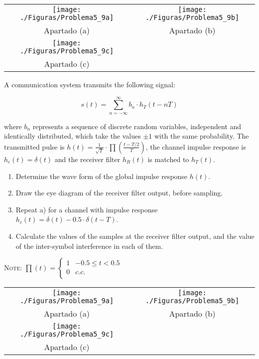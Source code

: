 \documentclass[es,boletin]{uah}
\begin{document}
{

\begin{tabular}[h]{cc}
	\texttt{[image: ./Figuras/Problema5\_9a]} &
	\texttt{[image: ./Figuras/Problema5\_9b]} \\
	Apartado (a) & Apartado (b) \\
	\texttt{[image: ./Figuras/Problema5\_9c]} &
	\\
	Apartado (c) & \\
\end{tabular}

}
{

A communication system transmits the following signal:

\begin{displaymath}
s(t) = \sum_{n=-\infty}^{\infty} b_n \cdot h_T(t-nT)
\end{displaymath}

where $b_n$ represents a sequence of discrete random variables, independent and identically distributed, which take the values $\pm 1$ with the same probability. The transmitted pulse is $h(t) = \frac{1}{\sqrt{T}} \cdot \prod \left ( \frac{t-T/2}{T} \right )$, the channel impulse response is $h_c(t)=\delta (t)$ and the receiver filter $h_R(t)$ is matched to $h_T(t)$. 

\begin{enumerate}
	\item Determine the wave form of the global impulse response $h(t)$.
	\item Draw the eye diagram of the receiver filter output, before sampling.
	\item Repeat a) for a channel with impulse response $h_c(t)=\delta (t) - 0.5 \cdot \delta (t-T)$.
	\item Calculate the values of the samples at the receiver filter output, and the value of the inter-symbol interference in each of them.
\end{enumerate}

\textsc{Note:} $\prod(t) = \left \{ \begin{array}{ll} 1 & -0.5\leq t <0.5 \\ 0 & c.c. \\
 \end{array} \right.$
 \ \\

}
{

\begin{tabular}[h]{cc}
	\texttt{[image: ./Figuras/Problema5\_9a]} &
	\texttt{[image: ./Figuras/Problema5\_9b]} \\
	Apartado (a) & Apartado (b) \\
	\texttt{[image: ./Figuras/Problema5\_9c]} &
	\\
	Apartado (c) & \\
\end{tabular}

}
\end{document}

